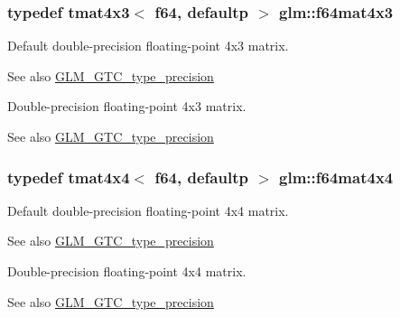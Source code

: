 \subsubsection[{f64mat4x3}]{\setlength{\rightskip}{0pt plus 5cm}typedef tmat4x3$<$ f64, defaultp $>$ {\bf glm\+::f64mat4x3}}\label{group__gtc__type__precision_gab10a195a85f65da47bf70438f57a8a3c}
Default double-\/precision floating-\/point 4x3 matrix. \begin{DoxySeeAlso}{See also}
\hyperlink{group__gtc__type__precision}{G\+L\+M\+\_\+\+G\+T\+C\+\_\+type\+\_\+precision}
\end{DoxySeeAlso}
Double-\/precision floating-\/point 4x3 matrix. \begin{DoxySeeAlso}{See also}
\hyperlink{group__gtc__type__precision}{G\+L\+M\+\_\+\+G\+T\+C\+\_\+type\+\_\+precision} 
\end{DoxySeeAlso}
\hypertarget{group__gtc__type__precision_ga6b1ada50de2fc7d991138ab857fb2476}{}
\subsubsection[{f64mat4x4}]{\setlength{\rightskip}{0pt plus 5cm}typedef tmat4x4$<$ f64, defaultp $>$ {\bf glm\+::f64mat4x4}}\label{group__gtc__type__precision_ga6b1ada50de2fc7d991138ab857fb2476}
Default double-\/precision floating-\/point 4x4 matrix. \begin{DoxySeeAlso}{See also}
\hyperlink{group__gtc__type__precision}{G\+L\+M\+\_\+\+G\+T\+C\+\_\+type\+\_\+precision}
\end{DoxySeeAlso}
Double-\/precision floating-\/point 4x4 matrix. \begin{DoxySeeAlso}{See also}
\hyperlink{group__gtc__type__precision}{G\+L\+M\+\_\+\+G\+T\+C\+\_\+type\+\_\+precision} 
\end{DoxySeeAlso}
\hypertarget{group__gtc__type__precision_ga5b54d7b36fbee5e271f73e6ed74e7172}{}
